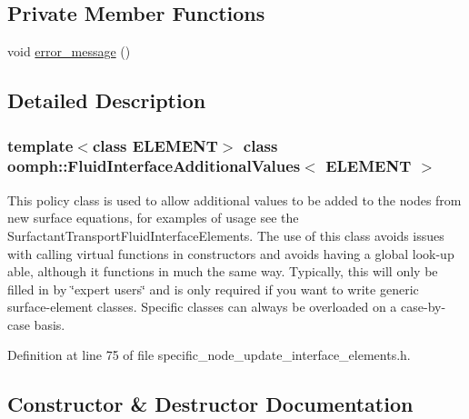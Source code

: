 \subsection*{Private Member Functions}
\begin{DoxyCompactItemize}
\item 
void \hyperlink{classoomph_1_1FluidInterfaceAdditionalValues_abcf9870977c827475d3ad4f5e9ec9ee9}{error\+\_\+message} ()
\end{DoxyCompactItemize}


\subsection{Detailed Description}
\subsubsection*{template$<$class E\+L\+E\+M\+E\+NT$>$\newline
class oomph\+::\+Fluid\+Interface\+Additional\+Values$<$ E\+L\+E\+M\+E\+N\+T $>$}

This policy class is used to allow additional values to be added to the nodes from new surface equations, for examples of usage see the Surfactant\+Transport\+Fluid\+Interface\+Elements. The use of this class avoids issues with calling virtual functions in constructors and avoids having a global look-\/up able, although it functions in much the same way. Typically, this will only be filled in by \char`\"{}expert users\char`\"{} and is only required if you want to write generic surface-\/element classes. Specific classes can always be overloaded on a case-\/by-\/case basis. 

Definition at line 75 of file specific\+\_\+node\+\_\+update\+\_\+interface\+\_\+elements.\+h.



\subsection{Constructor \& Destructor Documentation}
\mbox{\label{classoomph_1_1FluidInterfaceAdditionalValues_a90883b471723538d92a28fb691ce7230}} 
